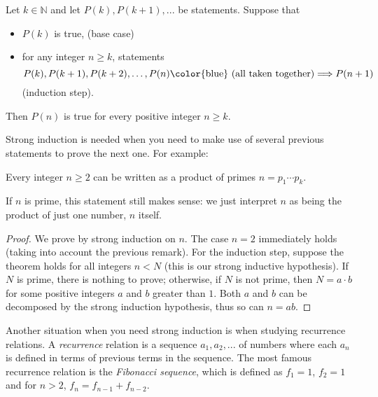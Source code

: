 \documentclass[11pt,dvipsnames]{book}
\numberwithin{figure}{section} %
\numberwithin{table}{section} %
\begin{document}
\begin{definition}
  Let $k\in \mathbb{N}$ and let $P(k),P(k+1),...$ be statements. Suppose that\
  \begin{itemize}
  \item $P(k)$ is true,  (base case)\
  \item for any integer
$n\geqslant k$, statements
\[ P(k),P(k+1),P(k+2),\ldots,P(n)\mbox{{\color{blue} (all taken together)}}\Longrightarrow
P(n+1)\]
(induction step).
\end{itemize}
Then $P(n)$ is true for every positive integer $n\geqslant k$.
\end{definition}

\vspace{10pt}

Strong induction is needed when you need to make use of several previous statements to prove the next one. For example:

\begin{theorem}
Every integer $n\geq 2$ can be written as a product of primes $n=p_{1}\cdots p_{k}$.
\end{theorem}

If $n$ is prime, this statement still makes sense: we just interpret $n$ as being the product of just one number, $n$ itself.

\begin{proof}
We prove by strong induction on $n$. The case $n=2$ immediately holds (taking into account the previous remark). For the induction step, suppose the theorem holds for all integers $n<N$ (this is our strong inductive hypothesis).  If $N$ is prime, there is nothing to prove; otherwise, if $N$ is not prime, then $N=a\cdot b$ for some positive integers $a$ and $b$ greater than $1$. Both $a$ and $b$ can be  decomposed by the strong induction hypothesis, thus so can $n=ab$.
\end{proof}

Another situation when you need strong induction is when studying recurrence relations. A {\it recurrence} relation is a sequence $a_{1},a_{2},...$ of numbers  where each $a_{n}$ is defined in terms of previous terms in the sequence. The most famous recurrence relation is the {\it Fibonacci sequence}, which is defined  as $f_{1}=1$, $f_{2}=1$ and for $n>2$, $f_{n}=f_{n-1}+f_{n-2}$.
\end{document}
